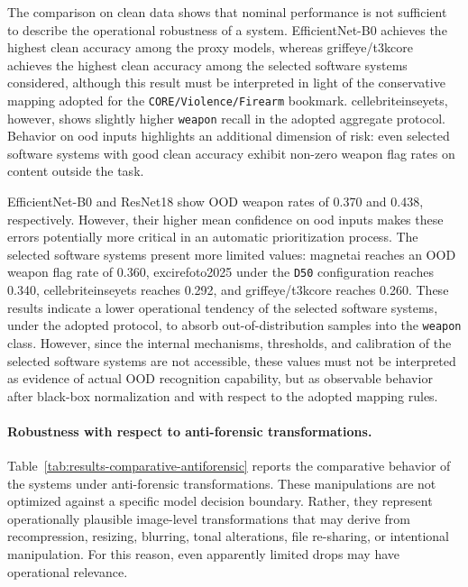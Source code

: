 The comparison on clean data shows that nominal performance is not sufficient
to describe the operational robustness of a system. EfficientNet-B0 achieves
the highest clean accuracy among the proxy models, whereas
\gls{griffeye}/\gls{t3kcore} achieves the highest clean accuracy among the
selected software systems considered, although this result must be interpreted
in light of the conservative mapping adopted for the
\texttt{CORE/Violence/Firearm} bookmark. \gls{cellebriteinseyets}, however,
shows slightly higher \texttt{weapon} recall in the adopted aggregate protocol.
Behavior on \gls{ood} inputs highlights an additional dimension of risk: even
selected software systems with good clean accuracy exhibit non-zero weapon flag
rates on content outside the task.

EfficientNet-B0 and ResNet18 show OOD weapon rates of 0.370 and 0.438,
respectively. However, their higher mean confidence on \gls{ood} inputs makes
these errors potentially more critical in an automatic prioritization process.
The selected software systems present more limited values: \gls{magnetai}
reaches an OOD weapon flag rate of 0.360, \gls{excirefoto2025} under the
\texttt{D50} configuration reaches 0.340, \gls{cellebriteinseyets} reaches
0.292, and \gls{griffeye}/\gls{t3kcore} reaches 0.260. These results indicate
a lower operational tendency of the selected software systems, under the
adopted protocol, to absorb out-of-distribution samples into the
\texttt{weapon} class. However, since the internal mechanisms, thresholds, and
calibration of the selected software systems are not accessible, these values
must not be interpreted as evidence of actual OOD recognition capability, but
as observable behavior after black-box normalization and with respect to the
adopted mapping rules.

\paragraph{Robustness with respect to anti-forensic transformations.}

Table~\ref{tab:results-comparative-antiforensic} reports the comparative
behavior of the systems under anti-forensic transformations. These manipulations
are not optimized against a specific model decision boundary. Rather, they
represent operationally plausible image-level transformations that may derive
from recompression, resizing, blurring, tonal alterations, file re-sharing, or
intentional manipulation. For this reason, even apparently limited drops may
have operational relevance.

